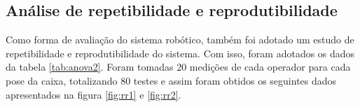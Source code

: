


\subsection{Análise de repetibilidade e reprodutibilidade}

Como forma de avaliação do sistema robótico, também foi adotado um estudo de repetibilidade e reprodutibilidade do sistema. Com isso, foram adotados os dados da tabela \ref*{tab:anova2}. Foram tomadas 20 medições de cada operador para cada pose da caixa, totalizando 80 testes e assim foram obtidos os seguintes dados apresentados na figura \ref*{fig:rr1} e \ref*{fig:rr2}.


